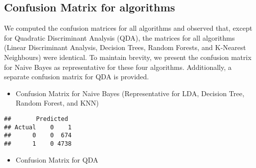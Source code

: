 \documentclass[
]{article}
\newenvironment{Shaded}{\begin{snugshade}}{\end{snugshade}}
\newcommand{\AttributeTok}[1]{\textcolor[rgb]{0.13,0.29,0.53}{#1}}
\newcommand{\DecValTok}[1]{\textcolor[rgb]{0.00,0.00,0.81}{#1}}
\newcommand{\FunctionTok}[1]{\textcolor[rgb]{0.13,0.29,0.53}{\textbf{#1}}}
\newcommand{\NormalTok}[1]{#1}
\newcommand{\OtherTok}[1]{\textcolor[rgb]{0.56,0.35,0.01}{#1}}
\newcommand{\SpecialCharTok}[1]{\textcolor[rgb]{0.81,0.36,0.00}{\textbf{#1}}}
\newcommand{\StringTok}[1]{\textcolor[rgb]{0.31,0.60,0.02}{#1}}
\providecommand{\tightlist}{%
  \setlength{\itemsep}{0pt}\setlength{\parskip}{0pt}}
\begin{document}
\hypertarget{confusion-matrix-for-algorithms}{%
\subsection{Confusion Matrix for
algorithms}\label{confusion-matrix-for-algorithms}}

We computed the confusion matrices for all algorithms and observed that,
except for Quadratic Discriminant Analysis (QDA), the matrices for all
algorithms (Linear Discriminant Analysis, Decision Trees, Random
Forests, and K-Nearest Neighbours) were identical. To maintain brevity,
we present the confusion matrix for Naive Bayes as representative for
these four algorithms. Additionally, a separate confusion matrix for QDA
is provided.

\begin{itemize}
\tightlist
\item
  Confusion Matrix for Naive Bayes (Representative for LDA, Decision
  Tree, Random Forest, and KNN)
\end{itemize}

\begin{Shaded}
\end{Shaded}

\begin{verbatim}
##       Predicted
## Actual    0    1
##      0    0  674
##      1    0 4738
\end{verbatim}

\begin{itemize}
\tightlist
\item
  Confusion Matrix for QDA
\end{itemize}
\end{document}

